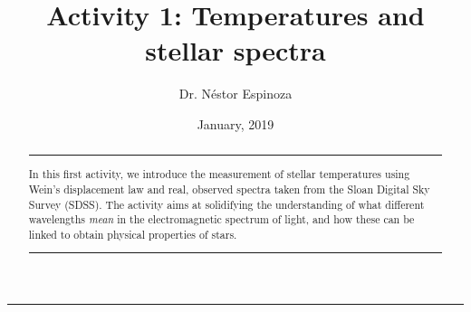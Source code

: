 \documentclass{tufte-handout}
\title{Activity 1: Temperatures and stellar spectra}
\author[Dr. N\'estor Espinoza]{Dr. N\'estor Espinoza}
\date{January, 2019}  %
\begin{document}
\noindent\textcolor{Red}{\rule{16cm}{3mm}}

{\let\newpage\relax\maketitle}

\begin{abstract}
\noindent\textcolor{Red}{\rule{10cm}{0.4mm}}
\noindent In this first activity, we introduce the measurement of stellar 
temperatures using Wein's displacement law and real, observed spectra taken 
from the Sloan Digital Sky Survey (SDSS). The activity aims at solidifying the 
understanding of what different wavelengths \textit{mean} in the electromagnetic 
spectrum of light, and how these can be linked to obtain physical properties of stars.

\noindent\textcolor{Red}{\rule{10cm}{0.4mm}}
\end{abstract}
\end{document}
